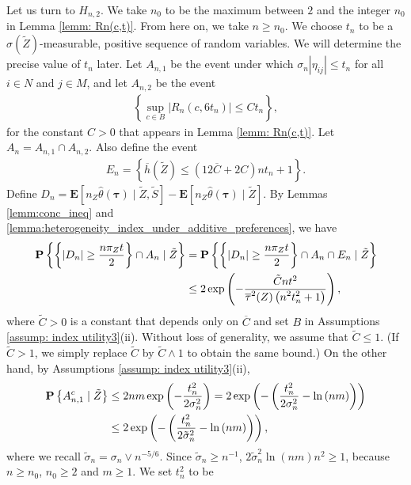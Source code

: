 \documentclass[12pt, fullpage]{amsart}
\theoremstyle{definition}
\theoremstyle{definition}
\theoremstyle{definition}
\begin{document}
\begin{bibunit}[econometrica]
Let us turn to $H_{n,2}$. We take $n_0$ to be the maximum between $2$ and the integer $n_0$ in Lemma \ref{lemm: Rn(c,t)}. From here on, we take $n \ge n_0$. We choose $t_n$ to be a $\sigma(\tilde Z)$-measurable, positive sequence of random variables. We will determine the precise value of $t_n$ later. Let $A_{n,1}$ be the event under which $\sigma_n |\eta_{ij}| \le t_n$ for all $i \in N$ and $j \in M$, and let $A_{n,2}$ be the event
\begin{align*}
	\left\{\sup_{c \in B} |R_n(c, 6 t_n)| \le C t_n\right\},
\end{align*}
for the constant $C>0$ that appears in Lemma \ref{lemm: Rn(c,t)}. Let $A_n = A_{n,1} \cap A_{n,2}$. Also define the event
\begin{align*}
	E_n =  \left\{\overline h(\tilde Z) \leq (12 \overline C + 2C) n t_n + 1\right\}.
\end{align*}
Define $D_n = \mathbf{E}\left[ n_Z \hat \theta(\boldsymbol{\tau}) \mid \tilde Z, \tilde S \right] - \mathbf{E}\left[ n_Z \hat \theta(\boldsymbol{\tau}) \mid \tilde Z \right]$. By Lemmas \ref{lemm:conc_ineq} and \ref{lemma:heterogeneity_index_under_additive_preferences}, we have
\begin{align}
	\label{ineqB}
	\mathbf{P}\left\{\left\{|D_n| \ge \frac{n \pi_Z t}{2} \right\} \cap A_n \mid \tilde Z \right\} &= \mathbf{P}\left\{\left\{|D_n| \ge \frac{n \pi_Z t}{2} \right\} \cap A_n \cap E_n \mid \tilde Z \right\}  \\ \notag
	&\le 2 \exp\left(-\frac{\tilde  C n t^2}{\displaystyle \overline \tau^2(Z) \left(n^2 t_n^2 + 1\right)} \right),
\end{align}
where $\tilde C > 0$ is a constant that depends only on $\overline C$ and set $B$ in Assumptions \ref{assump: index utility3}(ii). Without loss of generality, we assume that $\tilde C \le 1$. (If $\tilde C > 1$, we simply replace $\tilde C$ by $\tilde C \wedge 1$ to obtain the same bound.) On the other hand, by Assumptions \ref{assump: index utility3}(ii),
\begin{align}
	\label{bound}
	\mathbf{P}\left\{ A_{n,1}^c \mid \tilde Z \right\} &\le 2 n m \exp\left( - \frac{t_n^2}{2\sigma_n^2}\right) = 2 \exp\left( - \left( \frac{t_n^2}{2\sigma_n^2} - \ln\left( n m \right) \right)\right)\\ \notag
	&\le 2 \exp\left( - \left( \frac{t_n^2}{2 \tilde \sigma_n^2} - \ln\left( n m \right) \right)\right),
\end{align}
where we recall $\tilde \sigma_n = \sigma_n \vee n^{-5/6}$. Since $\tilde \sigma_n \ge n^{-1}$, $2 \tilde \sigma_n^2 \ln(n m) n^2 \ge 1$, because $n \ge n_0$, $n_0 \ge 2$ and $m \ge 1$. We set $t_n^2$ to be

\end{bibunit}
\end{document}
